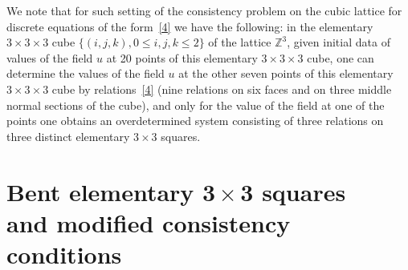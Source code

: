 \documentclass[11pt]{article}
\begin{document}
We note that for such setting of the consistency problem on the
cubic lattice for discrete equations of the form~\eqref{4} we have
the following: in the elementary $3 \times 3 \times 3$ cube $\{(i,
j, k), 0 \leq i, j, k \leq 2 \}$ of the lattice $\mathbb{Z}^3$,
given initial data of values of the f\/ield $u$ at 20 points of this
elementary $3 \times 3 \times 3$ cube, one can determine the values
of the f\/ield $u$ at the other seven points of this elementary $3
\times 3 \times 3$ cube by relations~\eqref{4} (nine relations on
six faces and on three middle normal sections of the cube), and only
for the value of the f\/ield at one of the points one obtains an
overdetermined system consisting of three relations on three
distinct elementary $3 \times 3$ squares.




\section[Bent elementary $3 \times 3$ squares
and modified consistency conditions]{Bent elementary $\boldsymbol{3 \times 3}$ squares\\
and modif\/ied consistency conditions}
\end{document}
